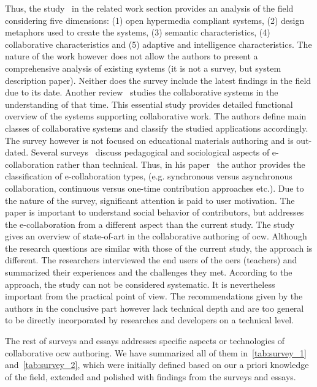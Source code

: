 \documentclass[PhD, Submit, ngerman,UKenglish,table]{scrbook}
\begin{document}
Thus, the study~\cite{garcia2005educational} in the related work section provides an analysis of the field considering five dimensions: (1) open hypermedia compliant systems, (2) design metaphors used to create the systems, (3) semantic characteristics, (4) collaborative characteristics and (5) adaptive and intelligence characteristics.
The nature of the work however does not allow the authors to present a comprehensive analysis of existing systems (it is not a survey, but system description paper).
Neither does the survey include the latest findings in the field due to its date.
Another review~\cite{Bafoutsou2002} studies the collaborative systems in the understanding of that time. 
This essential study provides detailed functional overview of the systems supporting collaborative work.
The authors define main classes of collaborative systems and classify the studied applications accordingly.
The survey however is not focused on educational materials authoring and is out-dated.
Several surveys~\cite{blau2013collaboration, Strobel2008} discuss pedagogical and sociological aspects of e-collaboration rather than technical.
Thus, in his paper~\cite{blau2013collaboration} the author provides the classification of e-collaboration types, (e.g. synchronous versus asynchronous collaboration, continuous versus one-time contribution approaches etc.).
Due to the nature of the survey, significant attention is paid to user motivation.
The paper is important to understand social behavior of contributors, but addresses the e-collaboration from a different aspect than the current study.
The study~\cite{Luo2010} gives an overview of state-of-art in the collaborative authoring of \gls{ocw}.
Although the research questions are similar with those of the current study, the approach is different.
The researchers interviewed the end users of the \gls{oer}s (teachers) and summarized their experiences and the challenges they met.
According to the approach, the study can not be considered systematic.
It is nevertheless important from the practical point of view.
The recommendations given by the authors in the conclusive part however lack technical depth and are too general to be directly incorporated by researches and developers on a technical level.


The rest of surveys and essays addresses specific aspects or technologies of collaborative \gls{ocw} authoring.
We have summarized all of them in~\autoref{tab:survey_1} and~\autoref{tab:survey_2}, which were initially defined based on our a priori knowledge of the field, extended and polished with findings from the surveys and essays.
\end{document}

